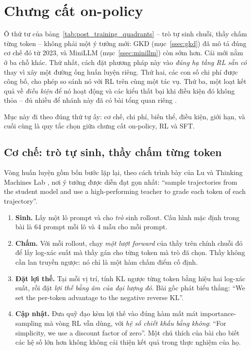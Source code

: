 
\section{Chưng cất on-policy}
\label{sec:on_policy_distillation}

Ô thứ tư của bảng~\ref{tab:post_training_quadrants} -- trò tự sinh chuỗi, thầy chấm từng token -- không phải một ý tưởng mới: GKD (mục~\ref{ssec:gkd}) đã mô tả đúng cơ chế đó từ 2023, và MiniLLM (mục~\ref{ssec:minillm}) còn sớm hơn. Cái mới nằm ở ba chỗ khác. Thứ nhất, cách đặt phương pháp này vào \emph{đúng hạ tầng RL sẵn có} thay vì xây một đường ống huấn luyện riêng. Thứ hai, các con số chi phí được công bố, cho phép so sánh nó với RL trên cùng một tác vụ. Thứ ba, một loạt kết quả về \emph{điều kiện} để nó hoạt động và các kiểu thất bại khi điều kiện đó không thỏa -- đủ nhiều để nhánh này đã có bài tổng quan riêng \cite{song2026opdsurvey}.

Mục này đi theo đúng thứ tự ấy: cơ chế, chi phí, biến thể, điều kiện, giới hạn, và cuối cùng là quy tắc chọn giữa chưng cất on-policy, RL và SFT.

\subsection{Cơ chế: trò tự sinh, thầy chấm từng token}
\label{ssec:opd_mechanism}

Vòng huấn luyện gồm bốn bước lặp lại, theo cách trình bày của Lu và Thinking Machines Lab \cite{lu2025opd}, nơi ý tưởng được diễn đạt gọn nhất: ``sample trajectories from the student model and use a high-performing teacher to grade each token of each trajectory''.

\begin{enumerate}
	\item \textbf{Sinh.} Lấy một lô prompt và cho \emph{trò} sinh rollout. Cấu hình mặc định trong bài là 64 prompt mỗi lô và 4 mẫu cho mỗi prompt.
	\item \textbf{Chấm.} Với mỗi rollout, chạy \emph{một lượt forward} của thầy trên chính chuỗi đó để lấy log-xác suất mà thầy gán cho từng token mà trò đã chọn. Thầy không cần lan truyền ngược: nó chỉ là một hàm chấm điểm cố định.
	\item \textbf{Đặt lợi thế.} Tại mỗi vị trí, tính KL ngược từng token bằng hiệu hai log-xác suất, rồi đặt \emph{lợi thế bằng âm của đại lượng đó}. Bài gốc phát biểu thẳng: ``We set the per-token advantage to the negative reverse KL''.
	\item \textbf{Cập nhật.} Đưa quỹ đạo kèm lợi thế vào đúng hàm mất mát importance-sampling mà vòng RL vẫn dùng, với \emph{hệ số chiết khấu bằng không}: ``For simplicity, we use a discount factor of zero''. Một chú thích của bài cho biết các hệ số lớn hơn không không cải thiện kết quả trong thực nghiệm của họ.
\end{enumerate}


